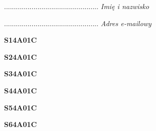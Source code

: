 \begin{turn}{90}\begin{minipage}{\linewidth} \vspace{20mm} ................................................  \textit{Imię i nazwisko}\end{minipage}\end{turn}

\begin{turn}{90}\begin{minipage}{\linewidth} \vspace{20mm} ................................................  \textit{Adres e-mailowy}\end{minipage}\end{turn}

\begin{turn}{90}\huge \begin{minipage}{\linewidth} \vspace{10mm}\textbf{S14A01C}\end{minipage}\end{turn}

\begin{turn}{90}\huge \begin{minipage}{\linewidth} \vspace{10mm}\textbf{S24A01C}\end{minipage}\end{turn}

\begin{turn}{90}\huge \begin{minipage}{\linewidth} \vspace{10mm}\textbf{S34A01C}\end{minipage}\end{turn}

\begin{turn}{90}\huge \begin{minipage}{\linewidth} \vspace{10mm}\textbf{S44A01C}\end{minipage}\end{turn}

\begin{turn}{90}\huge \begin{minipage}{\linewidth} \vspace{10mm}\textbf{S54A01C}\end{minipage}\end{turn}

\begin{turn}{90}\huge \begin{minipage}{\linewidth} \vspace{10mm}\textbf{S64A01C}\end{minipage}\end{turn}

